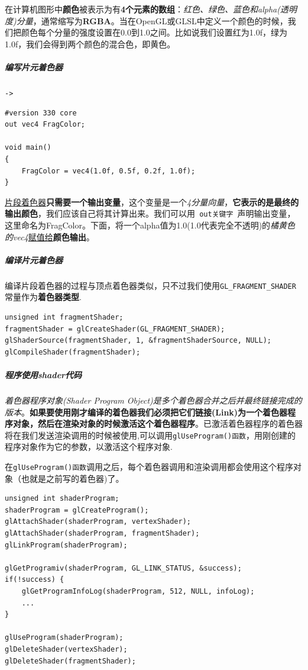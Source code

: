 \documentclass[UTF8,a4paper,12pt]{ctexbook}
\begin{document}
				在计算机图形中\textbf{颜色}被表示为有\textbf{4个元素的数组}：\textit{红色、绿色、蓝色和alpha(透明度)分量}，通常缩写为\textbf{RGBA}。当在OpenGL或GLSL中定义一个颜色的时候，我们把颜色每个分量的强度设置在0.0到1.0之间。比如说我们设置红为1.0f，绿为1.0f，我们会得到两个颜色的混合色，即黄色。
				
				\subparagraph{编写片元着色器}\verb|->|
					\begin{lstlisting}
#version 330 core
out vec4 FragColor;

void main()
{
    FragColor = vec4(1.0f, 0.5f, 0.2f, 1.0f);
} 					
					\end{lstlisting}
				
					\underline{片段着色器}\textbf{只需要一个输出变量}，这个变量是一个\textit{4分量向量}，\textbf{它表示的是最终的输出颜色}，我们应该自己将其计算出来。我们可以用\verb| out关键字 |声明输出变量，这里命名为FragColor。下面，将一个alpha值为1.0(1.0代表完全不透明)的\textit{橘黄色的vec4}\underline{赋值给}\textbf{颜色输出}。					
					
					
				\subparagraph{编译片元着色器}
					编译片段着色器的过程与顶点着色器类似，只不过我们使用\verb|GL_FRAGMENT_SHADER|常量作为\textbf{着色器类型}.
					
					\begin{lstlisting}
unsigned int fragmentShader;
fragmentShader = glCreateShader(GL_FRAGMENT_SHADER);
glShaderSource(fragmentShader, 1, &fragmentShaderSource, NULL);
glCompileShader(fragmentShader);					
					\end{lstlisting}
				
				
				\subparagraph{程序使用shader代码}
					\textit{着色器程序对象(Shader Program Object)}\textit{是多个着色器合并之后并最终链接完成的版本}。\textbf{如果要使用刚才编译的着色器我们必须把它们链接(Link)为一个着色器程序对象，然后在渲染对象的时候激活这个着色器程序}。已激活着色器程序的着色器将在我们发送渲染调用的时候被使用,可以调用\verb|glUseProgram()函数|，用刚创建的程序对象作为它的参数，以激活这个程序对象.
					
					在\verb|glUseProgram()函数|调用之后，每个着色器调用和渲染调用都会使用这个程序对象（也就是之前写的着色器)了。
					
					\begin{lstlisting}
unsigned int shaderProgram;
shaderProgram = glCreateProgram();
glAttachShader(shaderProgram, vertexShader);
glAttachShader(shaderProgram, fragmentShader);
glLinkProgram(shaderProgram);	

glGetProgramiv(shaderProgram, GL_LINK_STATUS, &success);
if(!success) {
    glGetProgramInfoLog(shaderProgram, 512, NULL, infoLog);
    ...
}			

glUseProgram(shaderProgram);	
glDeleteShader(vertexShader);
glDeleteShader(fragmentShader);
					\end{lstlisting}
				
\end{document}
